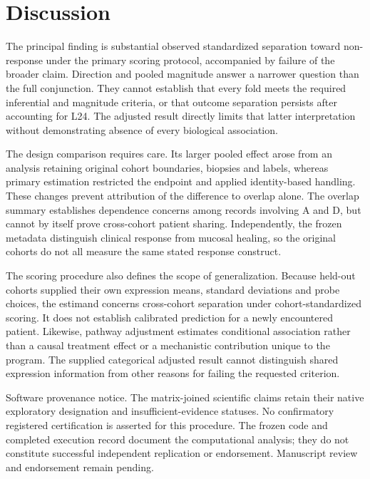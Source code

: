 \documentclass[10pt,a4paper]{article}
\begin{document}
\section*{Discussion}
The principal finding is substantial observed standardized separation toward non-response under the primary scoring protocol, accompanied by failure of the broader claim. Direction and pooled magnitude answer a narrower question than the full conjunction. They cannot establish that every fold meets the required inferential and magnitude criteria, or that outcome separation persists after accounting for L24. The adjusted result directly limits that latter interpretation without demonstrating absence of every biological association.
\par
The design comparison requires care. Its larger pooled effect arose from an analysis retaining original cohort boundaries, biopsies and labels, whereas primary estimation restricted the endpoint and applied identity-based handling. These changes prevent attribution of the difference to overlap alone. The overlap summary establishes dependence concerns among records involving A and D, but cannot by itself prove cross-cohort patient sharing. Independently, the frozen metadata distinguish clinical response from mucosal healing, so the original cohorts do not all measure the same stated response construct.
\par
The scoring procedure also defines the scope of generalization. Because held-out cohorts supplied their own expression means, standard deviations and probe choices, the estimand concerns cross-cohort separation under cohort-standardized scoring. It does not establish calibrated prediction for a newly encountered patient. Likewise, pathway adjustment estimates conditional association rather than a causal treatment effect or a mechanistic contribution unique to the program. The supplied categorical adjusted result cannot distinguish shared expression information from other reasons for failing the requested criterion.
\par
Software provenance notice. The matrix-joined scientific claims retain their native exploratory designation and insufficient-evidence statuses. No confirmatory registered certification is asserted for this procedure. The frozen code and completed execution record document the computational analysis; they do not constitute successful independent replication or endorsement. Manuscript review and endorsement remain pending.
\par
\end{document}
